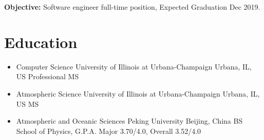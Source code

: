\documentclass[11pt,a4paper,sans]{moderncv}        %
\begin{document}
\makecvtitle

\vspace{-40pt}
\begin{center}
	\textbf{Objective:} Software engineer full-time position, Expected Graduation Dec 2019.
\end{center}
\vspace{-20pt}
\section{Education}
\vspace{-5pt}
\begin{itemize}
	\item {
	      {Computer Science}
	      {University of Illinois at Urbana-Champaign}
	      {Urbana, IL, US}
	      {Professional MS}
	      {}
	      }
	      
	\item {
	      {Atmospheric Science}
	      {University of Illinois at Urbana-Champaign}
	      {Urbana, IL, US}
	      {MS}
	      {}
	      }
	      
	\item {
	      {Atmospheric and Oceanic Sciences}
	      {Peking University}
	      {Beijing, China}
	      {BS}
	      {School of Physics, G.P.A. Major 3.70/4.0, Overall 3.52/4.0}
	      }
\end{itemize}

\vspace{-5pt}
\end{document}
